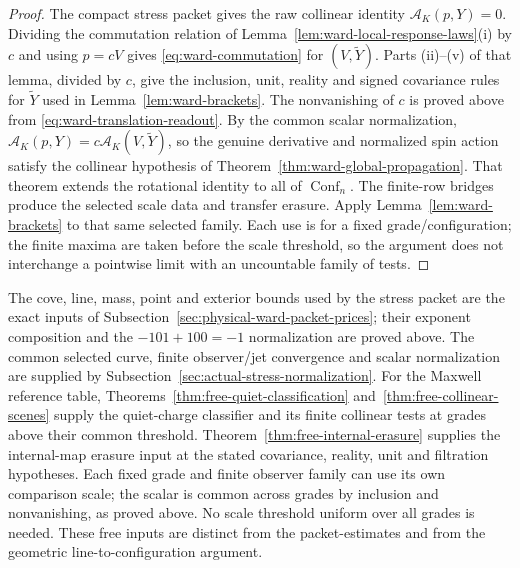 \begin{proof}
The compact stress packet gives the raw collinear identity
$\mathcal A_K(p,Y)=0$.  Dividing the commutation relation of
Lemma~\ref{lem:ward-local-response-laws}(i) by $c$ and using $p=cV$ gives
\eqref{eq:ward-commutation} for $(V,\widetilde Y)$.  Parts (ii)--(v) of
that lemma, divided by $c$, give the inclusion, unit, reality and signed
covariance rules for $\widetilde Y$ used in Lemma~\ref{lem:ward-brackets}.
The nonvanishing of $c$ is proved above from
\eqref{eq:ward-translation-readout}.  By the common scalar normalization,
$\mathcal A_K(p,Y)=c\mathcal A_K(V,\widetilde Y)$, so the genuine derivative
and normalized spin action satisfy the collinear hypothesis of
Theorem~\ref{thm:ward-global-propagation}.  That theorem extends the
rotational identity to all of $\operatorname{Conf}_n$.  The finite-row bridges produce
the selected scale data and transfer erasure.  Apply
Lemma~\ref{lem:ward-brackets} to that same selected family.  Each use is
for a fixed grade/configuration; the finite maxima are taken before the
scale threshold, so the argument does not interchange a pointwise limit
with an uncountable family of tests.
\end{proof}

The cove, line, mass, point and exterior bounds used by the stress packet
are the exact inputs of Subsection~\ref{sec:physical-ward-packet-prices}; their
exponent composition and the $-101+100=-1$ normalization are proved above.
The common selected curve, finite observer/jet convergence and scalar
normalization are supplied by Subsection~\ref{sec:actual-stress-normalization}.
For the Maxwell reference table, Theorems~\ref{thm:free-quiet-classification}
and~\ref{thm:free-collinear-scenes} supply the quiet-charge classifier and its
finite collinear tests at grades above their common threshold.
Theorem~\ref{thm:free-internal-erasure} supplies the internal-map erasure
input at the stated covariance, reality, unit and filtration hypotheses.
Each fixed grade and finite observer family can use its own comparison scale;
the scalar is common across grades by inclusion and nonvanishing, as proved
above. No scale threshold uniform over all grades is needed.
These free inputs are distinct from the packet-estimates and from the
geometric line-to-configuration argument.
